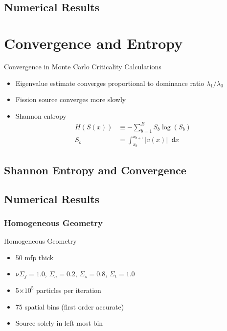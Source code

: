 \documentclass[xcolor={usenames, dvipsnames},]{beamer}
\newcommand{\dd}{\mathop{}\!\mathsf{d}}
\newcommand{\e}[1]{\ensuremath{\times 10^{#1}}}
\begin{document}
\subsection{Numerical Results}

\section{Convergence and Entropy}
\begin{frame}{Convergence in Monte Carlo Criticality Calculations}
    \begin{itemize}
        \item Eigenvalue estimate converges proportional to dominance ratio $\lambda_1/\lambda_0$
        \item Fission source converges more slowly
        \item Shannon entropy
        \begin{align*}
            H\left(S(x)\right) &\equiv -\sum_{b=1}^B S_b\log\left(S_b\right) \\[0.5em]
            S_b &= \int_{x_b}^{x_{b+1}} \left|v(x)\right| \dd x
        \end{align*}
    \end{itemize}
\end{frame}

\subsection{Shannon Entropy and Convergence}
\subsection{Numerical Results}
\subsubsection{Homogeneous Geometry}
\begin{frame}{Homogeneous Geometry}
    \begin{itemize}
        \item 50 mfp thick
        \item $\nu\Sigma_f = 1.0$, $\Sigma_a = 0.2$, $\Sigma_s = 0.8$, $\Sigma_t = 1.0$
        \item 5\e{5} particles per iteration
        \item 75 spatial bins (first order accurate)
        \item Source solely in left most bin
    \end{itemize}
\end{frame}
\end{document}
